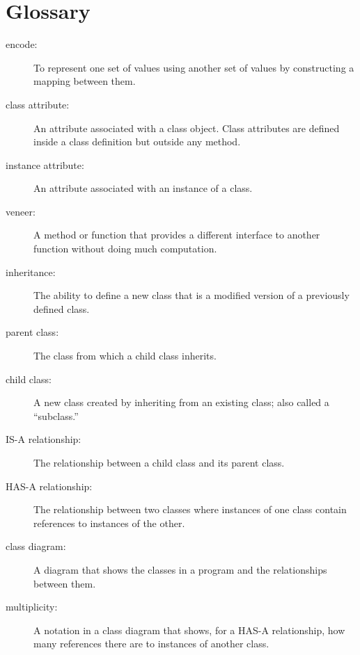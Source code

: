 \documentclass[12pt,a4paper,final,twoside,onecolumn,titlepage]{book}
\begin{document}
\section{Glossary}

\begin{description}

\item[encode:]  To represent one set of values using another
set of values by constructing a mapping between them.

\item[class attribute:] An attribute associated with a class
object.  Class attributes are defined inside
a class definition but outside any method.

\item[instance attribute:] An attribute associated with an
instance of a class.

\item[veneer:] A method or function that provides a different
interface to another function without doing much computation.

\item[inheritance:] The ability to define a new class that is a
modified version of a previously defined class.

\item[parent class:] The class from which a child class inherits.

\item[child class:] A new class created by inheriting from an
existing class; also called a ``subclass.''

\item[IS-A relationship:] The relationship between a child class
and its parent class.

\item[HAS-A relationship:] The relationship between two classes
where instances of one class contain references to instances of
the other.

\item[class diagram:] A diagram that shows the classes in a program
and the relationships between them.

\item[multiplicity:] A notation in a class diagram that shows, for
a HAS-A relationship, how many references there are to instances
of another class.

\end{description}
\end{document}
